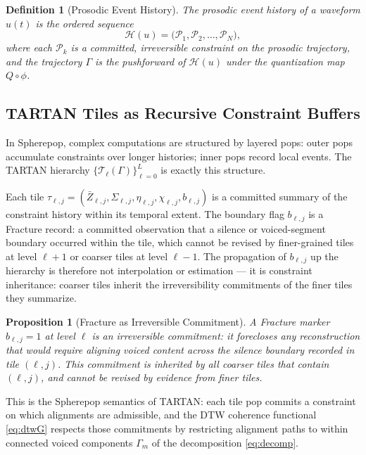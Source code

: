 \documentclass[12pt, a4paper]{article}
\newtheorem{definition}{Definition}
\newtheorem{proposition}{Proposition}
\begin{document}
\begin{definition}[Prosodic Event History]
\label{def:eventhistory}
The prosodic event history of a waveform $u(t)$ is the ordered sequence
\begin{equation}
\mathcal{H}(u) = \bigl(\mathcal{P}_1, \mathcal{P}_2, \ldots, \mathcal{P}_N\bigr),
\label{eq:eventhistory}
\end{equation}
where each $\mathcal{P}_k$ is a committed, irreversible constraint on the prosodic trajectory, and the trajectory $\Gamma$ is the pushforward of $\mathcal{H}(u)$ under the quantization map $Q \circ \phi$.
\end{definition}

\subsection{TARTAN Tiles as Recursive Constraint Buffers}

In Spherepop, complex computations are structured by layered pops: outer pops accumulate constraints over longer histories; inner pops record local events. The TARTAN hierarchy $\{\mathcal{T}_\ell(\Gamma)\}_{\ell=0}^L$ is exactly this structure.

Each tile $\tau_{\ell,j} = (\bar{Z}_{\ell,j}, \Sigma_{\ell,j}, \eta_{\ell,j}, \chi_{\ell,j}, b_{\ell,j})$ is a committed summary of the constraint history within its temporal extent. The boundary flag $b_{\ell,j}$ is a Fracture record: a committed observation that a silence or voiced-segment boundary occurred within the tile, which cannot be revised by finer-grained tiles at level $\ell+1$ or coarser tiles at level $\ell-1$. The propagation of $b_{\ell,j}$ up the hierarchy is therefore not interpolation or estimation — it is constraint inheritance: coarser tiles inherit the irreversibility commitments of the finer tiles they summarize.

\begin{proposition}[Fracture as Irreversible Commitment]
A Fracture marker $b_{\ell,j} = 1$ at level $\ell$ is an irreversible commitment: it forecloses any reconstruction that would require aligning voiced content across the silence boundary recorded in tile $(\ell, j)$. This commitment is inherited by all coarser tiles that contain $(\ell, j)$, and cannot be revised by evidence from finer tiles.
\end{proposition}

This is the Spherepop semantics of TARTAN: each tile pop commits a constraint on which alignments are admissible, and the DTW coherence functional \eqref{eq:dtwG} respects those commitments by restricting alignment paths to within connected voiced components $\Gamma_m$ of the decomposition \eqref{eq:decomp}.
\end{document}
